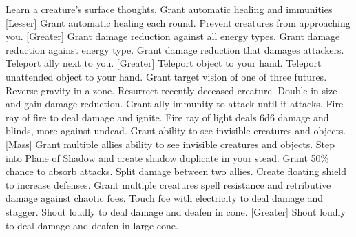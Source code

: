     {Learn a creature's surface thoughts.}
    {Grant automatic healing and immunities}
[Lesser]
    {Grant automatic healing each round.}
    {Prevent creatures from approaching you.}
[Greater]
    {Grant damage reduction against all energy types.}
    {Grant damage reduction against energy type.}
    {Grant damage reduction that damages attackers.}
    {Teleport ally next to you.}
[Greater]
    {Teleport object to your hand.}
    {Teleport unattended object to your hand.}
    {Grant target vision of one of three futures.}
    {Reverse gravity in a zone.}
    {Resurrect recently deceased creature.}
    {Double in size and gain damage reduction.}
    {Grant ally immunity to attack until it attacks.}
    {Fire ray of fire to deal damage and ignite.}
    {Fire ray of light deals 6d6 damage and blinds, more against undead.}
    {Grant ability to see invisible creatures and objects.}
[Mass]
    {Grant multiple allies ability to see invisible creatures and objects.}
    {Step into Plane of Shadow and create shadow duplicate in your stead.}
    {Grant 50\% chance to absorb attacks.}
    {Split damage between two allies.}
    {Create floating shield to increase defenses.}
    {Grant multiple creatures spell resistance and retributive damage against chaotic foes.}
    {Touch foe with electricity to deal damage and stagger.}
    {Shout loudly to deal damage and deafen in cone.}
[Greater]
    {Shout loudly to deal damage and deafen in large cone.}
